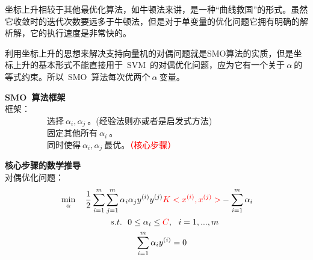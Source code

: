 \indent 坐标上升相较于其他最优化算法，如牛顿法来讲，是一种“曲线救国”的形式。虽然它收敛时的迭代次数要远多于牛顿法，但是对于单变量的优化问题它拥有明确的解析解，它的执行速度是非常快的。

\indent 利用坐标上升的思想来解决支持向量机的对偶问题就是SMO算法的实质，但是坐标上升的基本形式不能直接用于~SVM~的对偶优化问题，应为它有一个关于$~\alpha~$的等式约束。所以~SMO~算法每次优两个$~\alpha~$变量。

\textbf{SMO~算法框架}~~\\
\indent 框架：\\
\indent ~~~~~~~~~~选择$~\alpha_i,\alpha_j~$。(经验法则亦或者是启发式方法)\\
\indent ~~~~~~~~~~固定其他所有$~\alpha_i~$。\\
\indent ~~~~~~~~~~同时使得$~\alpha_i,\alpha_j~$最优。\textcolor{red}{（核心步骤）}

\textbf{核心步骤的数学推导}~~\\
\indent 对偶优化问题：
\begin{align}
            &\min \limits_\alpha ~~~\frac{1}{2}\sum_{i=1}^{m}\sum_{j=1}^{m}\alpha_i\alpha_jy^{(i)}y^{(j)}\textcolor{red}{K<x^{(i)},x^{(j)}>}-\sum_{i=1}^{m}\alpha_i \nonumber\nonumber\\
         &~~~~~~~~~~~~~~~~~~s.t.~~0 \leq\alpha_i\leq \textcolor{red}{C},~~i=1,...,m \nonumber \\
               &~~~~~~~~~~~~~~~~~~~~~~~~~~~\sum_{i=1}^{m}\alpha_iy^{(i)}=0 \nonumber
\end{align}

